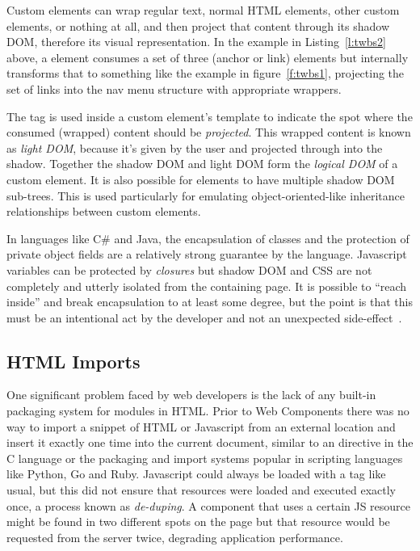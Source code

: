 Custom elements can wrap regular text, normal HTML elements, other custom elements, or nothing at all,
and then project that content through its shadow DOM, 
therefore its visual representation.
In the example in Listing~\ref{l:twbs2} above, 
a \textbf{} element consumes a set of three 
\textbf{} (anchor or link) elements but internally transforms that to something like the example in figure~\ref{f:twbs1}, 
projecting the set of links into the nav menu structure with appropriate wrappers.

The  tag is used inside a custom element's template to indicate the spot where the consumed (wrapped) content should be \textit{projected}. 
This wrapped content is known as 
\textit{light DOM}, 
because it's given by the user and projected through into the shadow.
Together the shadow DOM and light DOM form the \textit{logical DOM} of a custom element.
It is also possible for elements to have multiple shadow DOM sub-trees. 
This is used particularly for emulating object-oriented-like inheritance relationships between custom elements.

In languages like C\# and Java, the encapsulation of classes and the protection of private object fields are a relatively strong guarantee by the language.
Javascript variables can be protected by \textit{closures}
but shadow DOM and CSS are not completely and utterly isolated from the containing page.
It is possible to ``reach inside'' and break encapsulation to at least some degree, 
but the point is that this must be an intentional act by the developer and not an unexpected side-effect~\cite{bidelman2014}.

\subsection{HTML Imports}
One significant problem faced by web developers is the lack of any built-in packaging system for modules in HTML.
Prior to Web Components there was no way to import a snippet of HTML or Javascript from an external location and insert it exactly one time into the current document, 
similar to an  directive in the C language or the packaging and import systems popular in scripting languages
like Python, Go and Ruby. 
Javascript could always be loaded with a  tag like usual, but this did not ensure that resources were loaded and executed exactly once, a process known as \textit{de-duping}.
A component that uses a certain JS resource might be found in two different spots on the page but that resource would be requested from the server twice, degrading application performance.

